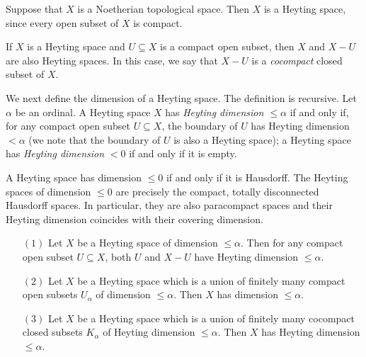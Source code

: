\begin{remark}
Suppose that $X$ is a Noetherian topological space. Then $X$ is
a Heyting space, since every open subset of $X$ is compact.
\end{remark}

\begin{remark}
If $X$ is a Heyting space and $U \subseteq X$ is a compact open
subset, then $X$ and $X-U$ are also Heyting spaces. In this case,
we say that $X-U$ is a {\it cocompact} closed subset of $X$.
\end{remark}

We next define the dimension of a Heyting space. The definition is
recursive. Let $\alpha$ be an ordinal. A Heyting space $X$ has
{\it Heyting dimension $\leq \alpha$} if and only if, for any
compact open subset $U \subseteq X$, the boundary of $U$ has
Heyting dimension $< \alpha$ (we note that the boundary of $U$ is
also a Heyting space); a Heyting space has {\it Heyting dimension} $< 0$ if and
only if it is empty.

\begin{remark}
A Heyting space has dimension $\leq 0$ if and only if it is
Hausdorff. The Heyting spaces of dimension $\leq 0$ are precisely
the compact, totally disconnected Hausdorff spaces. In particular,
they are also paracompact spaces and their Heyting dimension
coincides with their covering dimension.
\end{remark}

\begin{proposition}\label{closs}

\begin{itemize}
\item[$(1)$] Let $X$ be a Heyting space of dimension $\leq \alpha$. Then
for any compact open subset $U \subseteq X$, both $U$ and $X-U$
have Heyting dimension $\leq \alpha$.

\item[$(2)$] Let $X$ be a Heyting space which is a union of finitely many
compact open subsets $U_{\alpha}$ of dimension $\leq \alpha$. Then
$X$ has dimension $\leq \alpha$.

\item[$(3)$] Let $X$ be a Heyting space which is a union of finitely many
cocompact closed subsets $K_{\alpha}$ of Heyting dimension $\leq
\alpha$. Then $X$ has Heyting dimension $\leq \alpha$.
\end{itemize}
\end{proposition}

